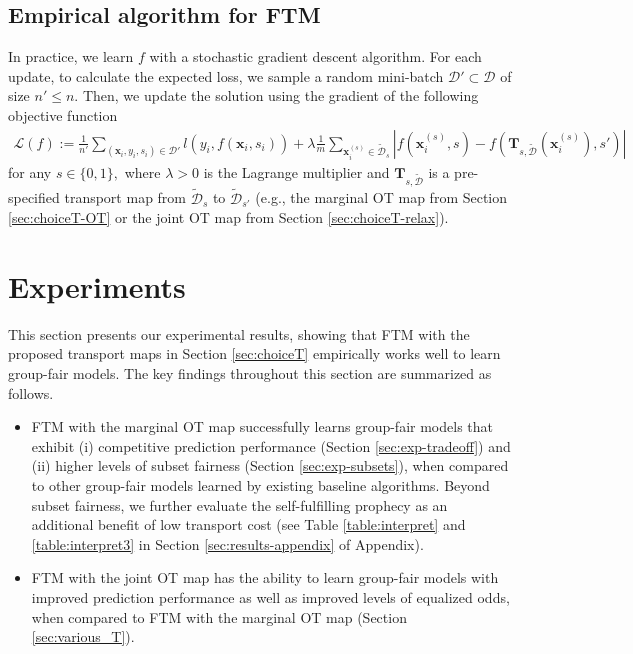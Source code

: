 \documentclass[10pt]{article} %
\begin{document}
\subsection{Empirical algorithm for FTM}
In practice, we learn $f$ with a stochastic gradient descent algorithm.
For each update, to calculate the expected loss, we sample a random mini-batch $\mathcal{D}' \subset \mathcal{D}$ of size $n' \le n.$
Then, we update the solution using the gradient of the following objective function
\begin{equation}
    \begin{split}
        \mathcal{L}(f) := \frac{1}{n'} \sum_{(\mathbf{x}_{i}, y_{i}, s_{i}) \in \mathcal{D}'} l(y_{i}, f(\mathbf{x}_{i}, s_{i}))
        + \lambda \frac{1}{m} \sum_{\mathbf{x}_{i}^{(s)} \in \tilde{\mathcal{D}}_{s}} \left\vert f(\mathbf{x}_{i}^{(s)}, s) - f(\mathbf{T}_{s, \tilde{\mathcal{D}}} (\mathbf{x}_{i}^{(s)}), s') \right\vert
    \end{split}
\end{equation}
for any $s\in \{0,1\},$
where $\lambda>0$ is the Lagrange multiplier and $ \mathbf{T}_{s, \tilde{\mathcal{D}}} $ is a pre-specified transport map from $\tilde{\mathcal{D}}_{s}$ to $\tilde{\mathcal{D}}_{s'}$ (e.g., the marginal OT map from Section \ref{sec:choiceT-OT} or the joint OT map from Section \ref{sec:choiceT-relax}).

\section{Experiments}\label{sec:exps}

This section presents our experimental results, showing that FTM with the proposed transport maps in Section \ref{sec:choiceT} empirically works well to learn group-fair models.
The key findings throughout this section are summarized as follows.
\begin{itemize} %
    \item[$\bullet$] 
    FTM with the marginal OT map successfully learns group-fair models that exhibit
    (i) competitive prediction performance (Section \ref{sec:exp-tradeoff})
    and
    (ii) higher levels of subset fairness (Section \ref{sec:exp-subsets}),
    when compared to other group-fair models learned by existing baseline algorithms.
    Beyond subset fairness, we further evaluate the self-fulfilling prophecy \citep{10.1145/2090236.2090255} as an additional benefit of low transport cost (see Table \ref{table:interpret} and \ref{table:interpret3} in Section \ref{sec:results-appendix} of Appendix).
    
    \item[$\bullet$] 
    FTM with the joint OT map has the ability to learn group-fair models with improved prediction performance as well as improved levels of equalized odds, when compared to FTM with the marginal OT map (Section \ref{sec:various_T}).    
\end{itemize}
\end{document}
